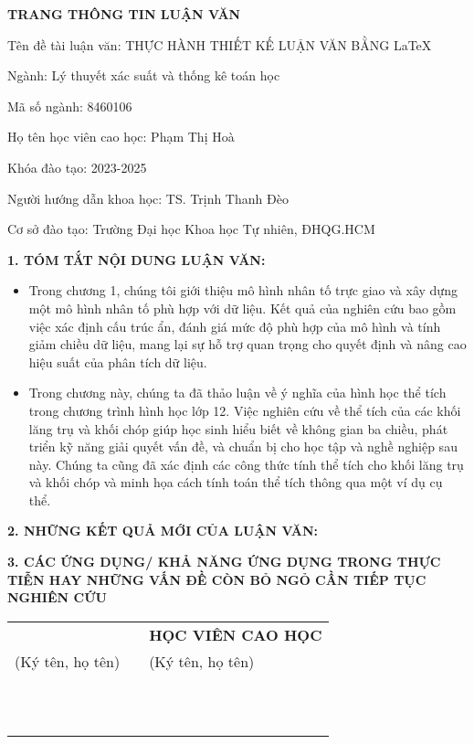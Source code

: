 \newpage
{}
{\centering \bf TRANG THÔNG TIN LUẬN VĂN \par}
\vspace*{1cm}

Tên đề tài luận văn: THỰC HÀNH THIẾT KẾ LUẬN VĂN BẰNG \LaTeX

Ngành: Lý thuyết xác suất và thống kê toán học

Mã số ngành: 8460106

Họ tên học viên cao học: Phạm Thị Hoà

Khóa đào tạo: 2023-2025

Người hướng dẫn khoa học: TS. Trịnh Thanh Đèo

Cơ sở đào tạo: Trường Đại học Khoa học Tự nhiên, ĐHQG.HCM

{\bf 1. TÓM TẮT NỘI DUNG LUẬN VĂN:}
\begin{itemize}[label=-]
    \item Trong chương 1, chúng tôi giới thiệu mô hình nhân tố trực giao và xây dựng một mô hình nhân tố phù hợp với dữ liệu. Kết quả của nghiên cứu bao gồm việc xác định cấu trúc ẩn, đánh giá mức độ phù hợp của mô hình và tính giảm chiều dữ liệu, mang lại sự hỗ trợ quan trọng cho quyết định và nâng cao hiệu suất của phân tích dữ liệu.
    \item Trong chương này, chúng ta đã thảo luận về ý nghĩa của hình học thể tích trong chương trình hình học lớp 12. Việc nghiên cứu về thể tích của các khối lăng trụ và khối chóp giúp học sinh hiểu biết về không gian ba chiều, phát triển kỹ năng giải quyết vấn đề, và chuẩn bị cho học tập và nghề nghiệp sau này. Chúng ta cũng đã xác định các công thức tính thể tích cho khối lăng trụ và khối chóp và minh họa cách tính toán thể tích thông qua một ví dụ cụ thể.
\end{itemize}

{\bf 2. NHỮNG KẾT QUẢ MỚI CỦA LUẬN VĂN:}
\vspace*{1cm}

{\bf 3. CÁC ỨNG DỤNG/ KHẢ NĂNG ỨNG DỤNG TRONG THỰC TIỄN HAY NHỮNG VẤN ĐỀ CÒN BỎ NGỎ CẦN TIẾP TỤC NGHIÊN CỨU}
\vspace*{1cm}
\newpage
\begin{tabular}{>{\centering\arraybackslash}m{5cm} >{\centering\arraybackslash}m{5cm} >{\centering\arraybackslash}m{5cm}}
    {\bf TẬP THỂ CÁN BỘ HƯỚNG DẪN} & & {\bf HỌC VIÊN CAO HỌC} \\
    (Ký tên, họ tên) & & (Ký tên, họ tên) \\
    & & \\
    & & \\
    & & \\
    & & \\
    & & \\
    & & \\
    & & \\
    & & \\
    & & \\
    \multicolumn{3}{c}{\bf XÁC NHẬN CỦA CƠ SỞ ĐÀO TẠO} \\
    \multicolumn{3}{c}{\bf HIỆU TRƯỞNG} \\
\end{tabular}
\clearpage
